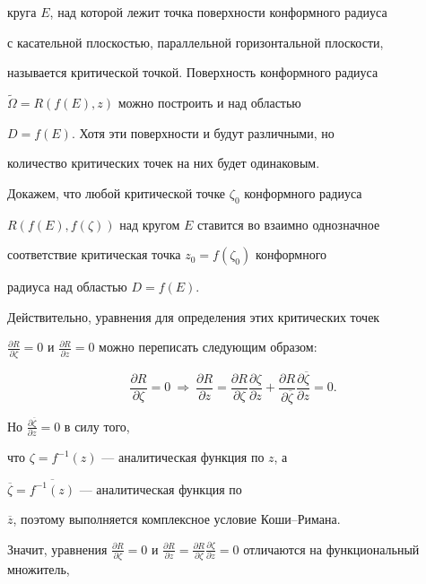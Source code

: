 круга $E$, над которой лежит точка поверхности конформного радиуса


с касательной плоскостью, параллельной горизонтальной плоскости,


называется критической точкой. Поверхность конформного радиуса


$\widetilde{\Omega}=R(f(E),z)$ можно построить и над областью


${D}=f(E)$. Хотя эти поверхности и будут различными, но


количество критических точек на них будет одинаковым.





Докажем, что любой критической точке $\zeta_0$ конформного радиуса


$R(f(E),f(\zeta))$ над кругом $E$ ставится во взаимно однозначное


соответствие критическая точка $z_0=f(\zeta_0)$ конформного


радиуса над областью ${D}=f(E)$.


Действительно, уравнения для определения этих критических точек


$\frac{\partial R}{\partial \zeta}=0$ и $\frac{\partial


R}{\partial z}=0$ можно переписать следующим образом:


$$


\frac{\partial R}{\partial \zeta}=0\ \Rightarrow


\ \frac{\partial R}{\partial z}=


\frac{\partial R}{\partial \zeta}\frac{\partial \zeta}{\partial z}+


\frac{\partial R}{\partial \overline{\zeta}}\frac{\partial \overline{\zeta}}{\partial


z}=0.


$$


Но $\frac{\partial \overline{\zeta}}{\partial z}=0$ в силу того,


что $\zeta=f^{-1}(z)$ --- аналитическая функция по $z$, а


$\overline{\zeta}=\overline{f^{-1}(z)}$ --- аналитическая функция по


$\overline{z}$, поэтому выполняется комплексное условие Коши--Римана.


Значит, уравнения $\frac{\partial R}{\partial \zeta}=0$ и $\frac{\partial


R}{\partial z}= \frac{\partial R}{\partial \zeta}\frac{\partial


\zeta}{\partial z}=0$ отличаются на функциональный множитель,


